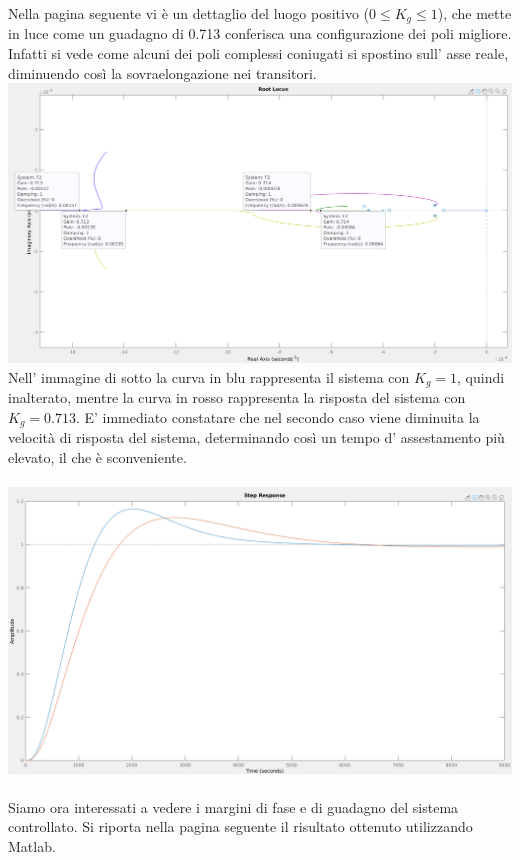 \documentclass[Lau,noexaminfo]{sapthesis}
\begin{document}
	Nella pagina seguente vi è un dettaglio del luogo positivo ($0\le K_g\le 1$), che mette in luce come un guadagno di 0.713 conferisca una configurazione dei poli migliore. Infatti si vede come alcuni dei poli complessi coniugati si spostino sull' asse reale, diminuendo così la sovraelongazione nei transitori.\\
	\includegraphics[scale=0.42,angle=90]{rlocus_F2_particolare}\\
	Nell' immagine di sotto la curva in blu rappresenta il sistema con $K_g=1$, quindi inalterato, mentre la curva in rosso rappresenta la risposta del sistema con $K_g=0.713$. E' immediato constatare che nel secondo caso viene diminuita la velocità di risposta del sistema, determinando così un tempo d' assestamento più elevato, il che è sconveniente.\\\\
	\includegraphics[scale=0.26]{step_k_modificato}\\\\
	Siamo ora interessati a vedere i margini di fase e di guadagno del sistema controllato. Si riporta nella pagina seguente il risultato ottenuto utilizzando Matlab.\\\\
\end{document}

